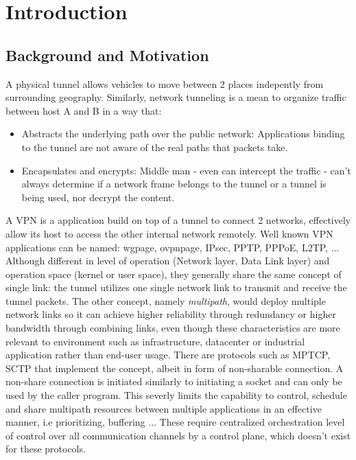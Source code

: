 \cleardoublepage\chapter{Introduction}
\minitoc\label{sec:introduction}\vspace{.5cm}

\section{Background and Motivation}
A physical tunnel allows vehicles to move between 2 places indepently from surrounding geography. 
Similarly, network tunneling is a mean to organize traffic between host A and B in a way that:

\begin{itemize}
    \item Abstracts the underlying path over the public network: Applications binding to the tunnel are not aware of the real paths that packets take.
    \item Encapsulates and encrypts: Middle man - even can intercept the traffic - can't always determine if a network frame belongs to the tunnel or a tunnel is being used, nor decrypt the content.
\end{itemize}

A \ac{VPN} is a application build on top of a tunnel to connect 2 networks, effectively allow its host to access the other internal network remotely.
Well known \ac{VPN} applications can be named: \ac{wgpage}, \ac{ovpnpage}, IPsec, PPTP, PPPoE, L2TP, ...
Although different in level of operation (Network layer, Data Link layer) and operation space (kernel or user space), they generally share the same concept of single link: the tunnel utilizes one single network link to transmit and receive the tunnel packets. 
The other concept, namely \textit{multipath}, would deploy multiple network links so it can achieve higher reliability through redundancy or higher bandwidth through combining links, even though these characteristics are more relevant to environment such as infrastructure, datacenter or industrial application rather than end-user usage.
There are protocols such as \ac{MPTCP}, \ac{SCTP} that implement the concept, albeit in form of non-sharable connection.
A non-share connection is initiated similarly to initiating a socket and can only be used by the caller program. 
This severly limits the capability to control, schedule and share multipath resources between multiple applications in an effective manner, i.e prioritizing, buffering ... 
These require centralized orchestration level of control over all communication channels by a control plane, which doesn't exist for these protocols.

